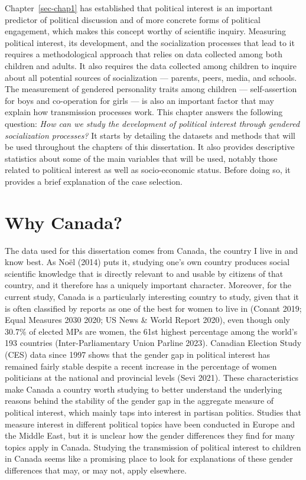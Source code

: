 \documentclass[
  letterpaper,
  DIV=11,
  numbers=noendperiod]{scrreprt}
\begin{document}
Chapter~\ref{sec-chap1} has established that political interest is an
important predictor of political discussion and of more concrete forms
of political engagement, which makes this concept worthy of scientific
inquiry. Measuring political interest, its development, and the
socialization processes that lead to it requires a methodological
approach that relies on data collected among both children and adults.
It also requires the data collected among children to inquire about all
potential sources of socialization --- parents, peers, media, and
schools. The measurement of gendered personality traits among children
--- self-assertion for boys and co-operation for girls --- is also an
important factor that may explain how transmission processes work. This
chapter answers the following question: \emph{How can we study the
development of political interest through gendered socialization
processes?} It starts by detailing the datasets and methods that will be
used throughout the chapters of this dissertation. It also provides
descriptive statistics about some of the main variables that will be
used, notably those related to political interest as well as
socio-economic status. Before doing so, it provides a brief explanation
of the case selection.

\hypertarget{why-canada}{%
\section{Why Canada?}\label{why-canada}}

The data used for this dissertation comes from Canada, the country I
live in and know best. As Noël (2014) puts it, studying one's own
country produces social scientific knowledge that is directly relevant
to and usable by citizens of that country, and it therefore has a
uniquely important character. Moreover, for the current study, Canada is
a particularly interesting country to study, given that it is often
classified by reports as one of the best for women to live in (Conant
2019; Equal Measures 2030 2020; US News \& World Report 2020), even
though only 30.7\% of elected MPs are women, the 61st highest percentage
among the world's 193 countries (Inter-Parliamentary Union Parline
2023). Canadian Election Study (CES) data since 1997 shows that the
gender gap in political interest has remained fairly stable despite a
recent increase in the percentage of women politicians at the national
and provincial levels (Sevi 2021). These characteristics make Canada a
country worth studying to better understand the underlying reasons
behind the stability of the gender gap in the aggregate measure of
political interest, which mainly taps into interest in partisan
politics. Studies that measure interest in different political topics
have been conducted in Europe and the Middle East, but it is unclear how
the gender differences they find for many topics apply in Canada.
Studying the transmission of political interest to children in Canada
seems like a promising place to look for explanations of these gender
differences that may, or may not, apply elsewhere.
\end{document}
